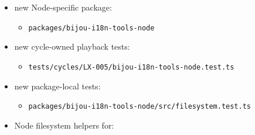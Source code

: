 \begin{itemize}
\tightlist
\item
  new Node-specific package:

  \begin{itemize}
  \tightlist
  \item
    \texttt{p\allowbreak{}a\allowbreak{}c\allowbreak{}k\allowbreak{}a\allowbreak{}g\allowbreak{}e\allowbreak{}s\allowbreak{}/\allowbreak{}b\allowbreak{}i\allowbreak{}j\allowbreak{}o\allowbreak{}u\allowbreak{}-\allowbreak{}i\allowbreak{}1\allowbreak{}8\allowbreak{}n\allowbreak{}-\allowbreak{}t\allowbreak{}o\allowbreak{}o\allowbreak{}l\allowbreak{}s\allowbreak{}-\allowbreak{}n\allowbreak{}o\allowbreak{}d\allowbreak{}e}
  \end{itemize}
\item
  new cycle-owned playback tests:

  \begin{itemize}
  \tightlist
  \item
    \texttt{t\allowbreak{}e\allowbreak{}s\allowbreak{}t\allowbreak{}s\allowbreak{}/\allowbreak{}c\allowbreak{}y\allowbreak{}c\allowbreak{}l\allowbreak{}e\allowbreak{}s\allowbreak{}/\allowbreak{}L\allowbreak{}X\allowbreak{}-\allowbreak{}0\allowbreak{}0\allowbreak{}5\allowbreak{}/\allowbreak{}b\allowbreak{}i\allowbreak{}j\allowbreak{}o\allowbreak{}u\allowbreak{}-\allowbreak{}i\allowbreak{}1\allowbreak{}8\allowbreak{}n\allowbreak{}-\allowbreak{}t\allowbreak{}o\allowbreak{}o\allowbreak{}l\allowbreak{}s\allowbreak{}-\allowbreak{}n\allowbreak{}o\allowbreak{}d\allowbreak{}e\allowbreak{}.\allowbreak{}t\allowbreak{}e\allowbreak{}s\allowbreak{}t\allowbreak{}.\allowbreak{}t\allowbreak{}s}
  \end{itemize}
\item
  new package-local tests:

  \begin{itemize}
  \tightlist
  \item
    \texttt{p\allowbreak{}a\allowbreak{}c\allowbreak{}k\allowbreak{}a\allowbreak{}g\allowbreak{}e\allowbreak{}s\allowbreak{}/\allowbreak{}b\allowbreak{}i\allowbreak{}j\allowbreak{}o\allowbreak{}u\allowbreak{}-\allowbreak{}i\allowbreak{}1\allowbreak{}8\allowbreak{}n\allowbreak{}-\allowbreak{}t\allowbreak{}o\allowbreak{}o\allowbreak{}l\allowbreak{}s\allowbreak{}-\allowbreak{}n\allowbreak{}o\allowbreak{}d\allowbreak{}e\allowbreak{}/\allowbreak{}s\allowbreak{}r\allowbreak{}c\allowbreak{}/\allowbreak{}f\allowbreak{}i\allowbreak{}l\allowbreak{}e\allowbreak{}s\allowbreak{}y\allowbreak{}s\allowbreak{}t\allowbreak{}e\allowbreak{}m\allowbreak{}.\allowbreak{}t\allowbreak{}e\allowbreak{}s\allowbreak{}t\allowbreak{}.\allowbreak{}t\allowbreak{}s}
  \end{itemize}
\item
  Node filesystem helpers for:


\end{itemize}
